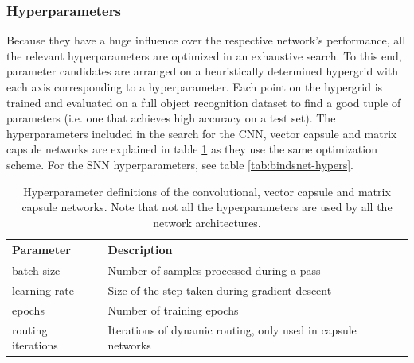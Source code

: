 \subsubsection{Hyperparameters}
Because they have a huge influence over the respective network's performance, all the relevant hyperparameters are optimized in an exhaustive search. To this end, parameter candidates are arranged on a heuristically determined hypergrid with each axis corresponding to a hyperparameter. Each point on the hypergrid is trained and evaluated on a full object recognition dataset to find a good tuple of parameters (i.e. one that achieves high accuracy on a test set). The hyperparameters included in the search for the CNN, vector capsule and matrix capsule networks are explained in table \ref{tab:pytorch-hypers} as they use the same optimization scheme. For the SNN hyperparameters, see table \ref{tab:bindsnet-hypers}.
\begin{table}[H]
\centering
\begin{tabular}{@{}ll@{}}
\toprule
Parameter           & Description                                                  \\ \midrule
batch size         & Number of samples processed during a pass                     \\
learning rate      & Size of the step taken during gradient descent               \\
epochs             & Number of training epochs                                    \\
routing iterations & Iterations of dynamic routing, only used in capsule networks \\ \bottomrule
\end{tabular}
\caption[Hyperparameter definitions of the convolutional, vector capsule and matrix capsule networks]{Hyperparameter definitions of the convolutional, vector capsule and matrix capsule networks. Note that not all the hyperparameters are used by all the network architectures.}
\label{tab:pytorch-hypers}
\end{table}

